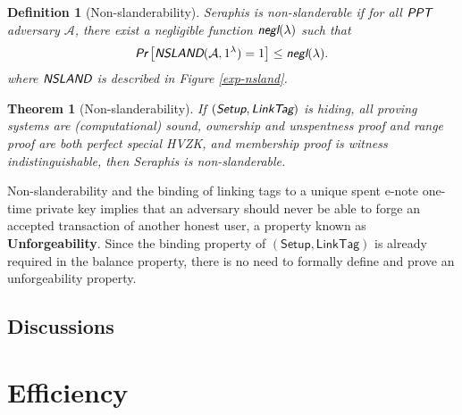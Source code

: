 \documentclass{article}
\newtheorem{definition}{Definition}[section]
\newtheorem{theorem}{Theorem}[section]
\begin{document}
\begin{definition}[Non-slanderability]
Seraphis is non-slanderable if for all $\emph{\textsf{PPT}}$ adversary $\mathcal{A}$, there exist a negligible function $\emph{\textsf{negl}}(\lambda)$ such that
\begin{align*}
\emph{\textsf{Pr}}
\left[
\emph{\textsf{NSLAND}}(\mathcal{A}, 1^{\lambda})=1
\right]
\le \emph{\textsf{negl}}(\lambda).
\end{align*}
where $\emph{\textsf{NSLAND}}$ is described in Figure \ref{exp-nsland}.
\end{definition}
\begin{theorem}[Non-slanderability]\label{thm-nsland}
If $(\emph{\textsf{Setup}},\emph{\textsf{LinkTag}})$ is hiding, all proving systems are (computational) sound, ownership and unspentness proof and range proof are both perfect special HVZK, and membership proof is witness indistinguishable, then Seraphis is non-slanderable.  
\end{theorem}
Non-slanderability and the binding of linking tags to a unique spent e-note one-time private key implies that an adversary should never be able to forge an accepted transaction of another honest user, a property known as \textbf{Unforgeability}. Since the binding property of $(\textsf{Setup},\textsf{LinkTag})$ is already required in the balance property, there is no need to formally define and prove an unforgeability property.

\subsection{Discussions}\label{sec-disc}

\section{Efficiency}




\appendix
\end{document}
